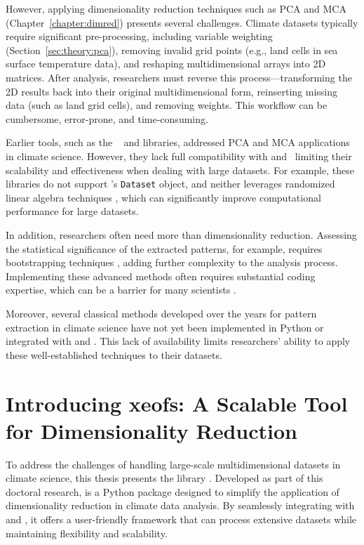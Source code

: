 However, applying dimensionality reduction techniques such as PCA and MCA (Chapter~\ref{chapter:dimred}) presents several challenges. Climate datasets typically require significant pre-processing, including variable weighting (Section~\ref{sec:theory:pca}), removing invalid grid points (e.g., land cells in sea surface temperature data), and reshaping multidimensional arrays into 2D matrices. After analysis, researchers must reverse this process---transforming the 2D results back into their original multidimensional form, reinserting missing data (such as land grid cells), and removing weights. This workflow can be cumbersome, error-prone, and time-consuming.

Earlier tools, such as the \ \cite{dawson_eofs_2016} and  \cite{he_xmca_2020} libraries, addressed PCA and MCA applications in climate science. However, they lack full compatibility with and \, limiting their scalability and effectiveness when dealing with large datasets. For example, these libraries do not support 's \texttt{Dataset} object, and neither leverages randomized linear algebra techniques \cite{halko_finding_2011,erichson_randomized_2019}, which can significantly improve computational performance for large datasets.

In addition, researchers often need more than dimensionality reduction. Assessing the statistical significance of the extracted patterns, for example, requires bootstrapping techniques \cite{efron_bootstrap_1979}, adding further complexity to the analysis process. Implementing these advanced methods often requires substantial coding expertise, which can be a barrier for many scientists \cite{wilson_good_2016}.

Moreover, several classical methods developed over the years for pattern extraction in climate science have not yet been implemented in Python or integrated with  and . This lack of availability limits researchers' ability to apply these well-established techniques to their datasets.



\section{Introducing xeofs: A Scalable Tool for Dimensionality Reduction}
\label{sec:xeofs:software}

To address the challenges of handling large-scale multidimensional datasets in climate science, this thesis presents the  library \cite{rieger_xeofs_2024}. Developed as part of this doctoral research,  is a Python package designed to simplify the application of dimensionality reduction in climate data analysis. By seamlessly integrating with  and , it offers a user-friendly framework that can process extensive datasets while maintaining flexibility and scalability.

